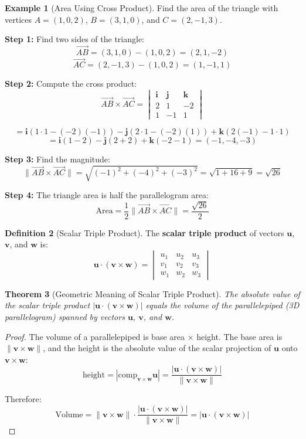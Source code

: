 \documentclass[12pt]{article}
\numberwithin{equation}{section}
\newcommand{\vect}[1]{\boldsymbol{#1}}   %
\theoremstyle{plain}
\newtheorem{theorem}{Theorem}[section]
\theoremstyle{definition}
\newtheorem{definition}[theorem]{Definition}
\newtheorem{example}[theorem]{Example}
\theoremstyle{remark}
\begin{document}
\begin{example}[Area Using Cross Product]
Find the area of the triangle with vertices $A = (1, 0, 2)$, $B = (3, 1, 0)$, and $C = (2, -1, 3)$.

\textbf{Step 1:} Find two sides of the triangle:
$$\overrightarrow{AB} = (3, 1, 0) - (1, 0, 2) = (2, 1, -2)$$
$$\overrightarrow{AC} = (2, -1, 3) - (1, 0, 2) = (1, -1, 1)$$

\textbf{Step 2:} Compute the cross product:
$$\overrightarrow{AB} \times \overrightarrow{AC} = \begin{vmatrix} \vect{i} & \vect{j} & \vect{k} \\ 2 & 1 & -2 \\ 1 & -1 & 1 \end{vmatrix}$$

$$= \vect{i}(1 \cdot 1 - (-2)(-1)) - \vect{j}(2 \cdot 1 - (-2)(1)) + \vect{k}(2(-1) - 1 \cdot 1)$$
$$= \vect{i}(1 - 2) - \vect{j}(2 + 2) + \vect{k}(-2 - 1) = (-1, -4, -3)$$

\textbf{Step 3:} Find the magnitude:
$$\|\overrightarrow{AB} \times \overrightarrow{AC}\| = \sqrt{(-1)^2 + (-4)^2 + (-3)^2} = \sqrt{1 + 16 + 9} = \sqrt{26}$$

\textbf{Step 4:} The triangle area is half the parallelogram area:
$$\text{Area} = \frac{1}{2}\|\overrightarrow{AB} \times \overrightarrow{AC}\| = \frac{\sqrt{26}}{2}$$
\end{example}

\begin{definition}[Scalar Triple Product]
The \textbf{scalar triple product} of vectors $\vect{u}$, $\vect{v}$, and $\vect{w}$ is:
$$\vect{u} \cdot (\vect{v} \times \vect{w}) = \begin{vmatrix} u_1 & u_2 & u_3 \\ v_1 & v_2 & v_3 \\ w_1 & w_2 & w_3 \end{vmatrix}$$
\end{definition}

\begin{theorem}[Geometric Meaning of Scalar Triple Product]
The absolute value of the scalar triple product $|\vect{u} \cdot (\vect{v} \times \vect{w})|$ equals the volume of the parallelepiped (3D parallelogram) spanned by vectors $\vect{u}$, $\vect{v}$, and $\vect{w}$.
\end{theorem}

\begin{proof}
The volume of a parallelepiped is base area × height. The base area is $\|\vect{v} \times \vect{w}\|$, and the height is the absolute value of the scalar projection of $\vect{u}$ onto $\vect{v} \times \vect{w}$:
$$\text{height} = \left|\text{comp}_{\vect{v} \times \vect{w}}\vect{u}\right| = \frac{|\vect{u} \cdot (\vect{v} \times \vect{w})|}{\|\vect{v} \times \vect{w}\|}$$

Therefore:
$$\text{Volume} = \|\vect{v} \times \vect{w}\| \cdot \frac{|\vect{u} \cdot (\vect{v} \times \vect{w})|}{\|\vect{v} \times \vect{w}\|} = |\vect{u} \cdot (\vect{v} \times \vect{w})|$$
\end{proof}
\end{document}
